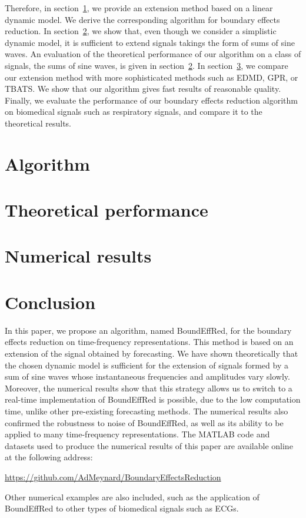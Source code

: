 \documentclass[journal]{IEEEtran}
\begin{document}
Therefore, in section~\ref{se:algo}, we provide an extension method based on a linear dynamic model. We derive the corresponding algorithm for boundary effects reduction. In section~\ref{se:theoretical}, we show that, even though we consider a simplistic dynamic model, it is sufficient to extend signals takings the form of sums of sine waves. An evaluation of the theoretical performance of our algorithm on a class of signals, the sums of sine waves, is given in section~\ref{se:theoretical}. In section~\ref{se:results}, we compare our extension method with more sophisticated methods such as EDMD, GPR, or TBATS. We show that our algorithm gives fast results of reasonable quality. Finally, we evaluate the performance of our boundary effects reduction algorithm on biomedical signals such as respiratory signals, and compare it to the theoretical results. 

\section{Algorithm}
\label{se:algo}



\section{Theoretical performance}
\label{se:theoretical}


\section{Numerical results}
\label{se:results}


\section{Conclusion}
\label{se:conclusion}
In this paper, we propose an algorithm, named {\sf BoundEffRed}, for the boundary effects reduction on time-frequency representations. This method is based on an extension of the signal obtained by forecasting. We have shown theoretically that the chosen dynamic model is sufficient for the extension of signals formed by a sum of sine waves whose instantaneous frequencies and amplitudes vary slowly. Moreover, the numerical results show that this strategy allows us to switch to a real-time implementation of {\sf BoundEffRed} is possible, due to the low computation time, unlike other pre-existing forecasting methods. The numerical results also confirmed the robustness to noise of {\sf BoundEffRed}, as well as its ability to be applied to many time-frequency representations. The MATLAB code and datasets used to produce the numerical results of this paper are available online at the following address:
\begin{center}
    {\small\url{https://github.com/AdMeynard/BoundaryEffectsReduction}}
\end{center}
Other numerical examples are also included, such as the application of {\sf BoundEffRed} to other types of biomedical signals such as ECGs.
\end{document}
